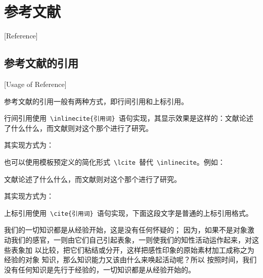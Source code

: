 
%
%
%

\chapter{参考文献}[Reference]
\label{chap07}

\section{参考文献的引用}[Usage of Reference]

参考文献的引用一般有两种方式，即行间引用和上标引用。

行间引用使用~\verb|\inlinecite{引用词}|~语句实现，其显示效果是这样的：文献论述了什么什么，而文献则对这个那个进行了研究。

其实现方式为：

\texttt{}

也可以使用模板预定义的简化形式~\verb|\lcite|~替代~\verb|\inlinecite|。例如：

文献论述了什么什么，而文献则对这个那个进行了研究。

其实现方式为：

\texttt{}

上标引用使用~\verb|\cite{引用词}|~语句实现，下面这段文字是普通的上标引用格式。

我们的一切知识都是从经验开始\cite{LQL1999}，这是没有任何怀疑的\cite{DXM2005}\cite{DXM2000}；
因为，如果不是对象激动我们的感官，一则由它们自己引起表象，一则使我们的知性活动运作起来，对这些表象加
以比较，把它们粘结或分开\cite{OJP1999,OJP1991}，这样把感性印象的原始素材加工成称之为经验的对象
知识，那么知识能力又该由什么来唤起活动呢\cite{braun2007,kelton2002,strawderman2001,LQL1999}？所以
按照时间，我们没有任何知识是先行于经验的，一切知识都是从经验开始的。

